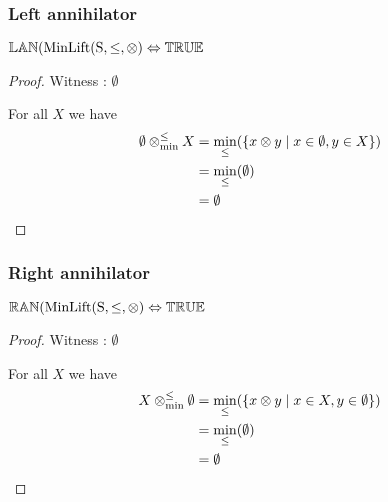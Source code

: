 \documentclass[../Summary.tex]{subfiles}
\begin{document}
\subsubsection{Left annihilator}

\begin{theorem}  \label{thm:minlift_lan}
${\mathbb{LAN}}(\mathrm{MinLift(S,\leq,\otimes)} \Leftrightarrow {\mathbb{TRUE}}$
\end{theorem}

\begin{proof}

\vspace{0.5em}

Witness : $\emptyset$

\vspace{0.5em}

For all $X$ we have
\begin{align*}
\emptyset \mathbin{\otimes_{\min}^{\leq}} X 	& = \min_\leq(\{ x \otimes y \mid x \in \emptyset, y \in X\}) \\
						& = \min_\leq(\emptyset) \\
						& = \emptyset
\end{align*}
\end{proof}





\subsubsection{Right annihilator}

\begin{theorem}  \label{thm:minlift_ran}
${\mathbb{RAN}}(\mathrm{MinLift(S,\leq,\otimes)} \Leftrightarrow {\mathbb{TRUE}}$
\end{theorem}

\begin{proof}

\vspace{0.5em}

Witness : $\emptyset$

\vspace{0.5em}

For all $X$ we have
\begin{align*}
X \mathbin{\otimes_{\min}^{\leq}} \emptyset 	& = \min_\leq(\{ x \otimes y \mid x \in X, y \in \emptyset\}) \\
						& = \min_\leq(\emptyset) \\
						& = \emptyset
\end{align*}
\end{proof}
\end{document}
